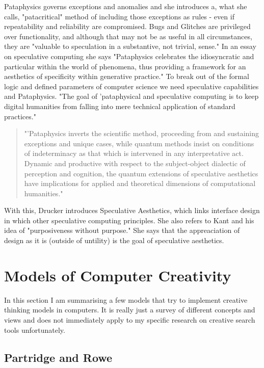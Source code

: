 Pataphysics governs exceptions and anomalies and she introduces a, what she calls, "patacritical" method of including those exceptions as rules - even if repeatability and reliability are compromised. Bugs and Glitches are privileged over functionality, and although that may not be as useful in all circumstances, they are "valuable to speculation in a substantive, not trivial, sense." In an essay on speculative computing \citep{Drucker2007} she says  "Pataphysics celebrates the idiosyncratic and particular within the world of phenomena, thus providing a framework for an aesthetics of specificity within generative practice." To break out of the formal logic and defined parameters of computer science we need speculative capabilities and Pataphysics. "The goal of 'pataphysical and speculative computing is to keep digital humanities from falling into mere technical application of standard practices."

\begin{quote}
  "'Pataphysics inverts the scientific method, proceeding from and sustaining exceptions and unique cases, while quantum methods insist on conditions of indeterminacy as that which is intervened in any interpretative act. Dynamic and productive with respect to the subject-object dialectic of perception and cognition, the quantum extensions of speculative aesthetics have implications for applied and theoretical dimensions of computational humanities." \citep{Drucker2007}
\end{quote}

With this, Drucker introduces Speculative Aesthetics, which links interface design in which other speculative computing principles. She also refers to Kant and his idea of "purposiveness without purpose." She says that the appreaciation of design as it is (outside of untility) is the goal of speculative aesthetics.

\section{Models of Computer Creativity}

In this section I am summarising a few models that try to implement creative thinking models in computers. It is really just a survey of different concepts and views and does not immediately apply to my specific research on creative search tools unfortunately.

\subsection{Partridge and Rowe}

